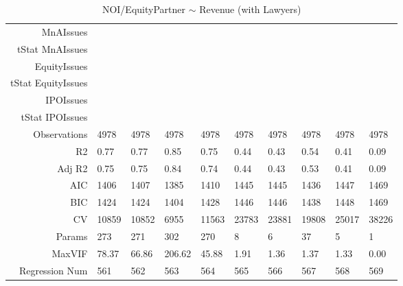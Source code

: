 \begin{table}[ht]
\begin{tabular}{rlllllllll}
  MnAIssues &  &  &  &  &  &  &  &  &  \\ 
  tStat MnAIssues &  &  &  &  &  &  &  &  &  \\ 
  EquityIssues &  &  &  &  &  &  &  &  &  \\ 
  tStat EquityIssues &  &  &  &  &  &  &  &  &  \\ 
  IPOIssues &  &  &  &  &  &  &  &  &  \\ 
  tStat IPOIssues &  &  &  &  &  &  &  &  &  \\ 
  Observations & 4978 & 4978 & 4978 & 4978 & 4978 & 4978 & 4978 & 4978 & 4978 \\ 
  R2 & 0.77 & 0.77 & 0.85 & 0.75 & 0.44 & 0.43 & 0.54 & 0.41 & 0.09 \\ 
  Adj R2 & 0.75 & 0.75 & 0.84 & 0.74 & 0.44 & 0.43 & 0.53 & 0.41 & 0.09 \\ 
  AIC & 1406 & 1407 & 1385 & 1410 & 1445 & 1445 & 1436 & 1447 & 1469 \\ 
  BIC & 1424 & 1424 & 1404 & 1428 & 1446 & 1446 & 1438 & 1448 & 1469 \\ 
  CV & 10859 & 10852 & 6955 & 11563 & 23783 & 23881 & 19808 & 25017 & 38226 \\ 
  Params & 273 & 271 & 302 & 270 & 8 & 6 & 37 & 5 & 1 \\ 
  MaxVIF & 78.37 & 66.86 & 206.62 & 45.88 & 1.91 & 1.36 & 1.37 & 1.33 & 0.00 \\ 
  Regression Num & 561 & 562 & 563 & 564 & 565 & 566 & 567 & 568 & 569 \\ 
   \hline
\end{tabular}
\caption{NOI/EquityPartner $\sim$ Revenue (with Lawyers)} 
\end{table}
